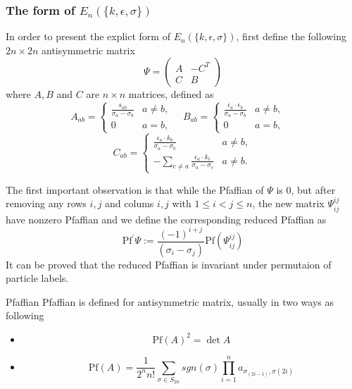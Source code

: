 \documentclass{beamer}
\begin{document}
\begin{frame}
    \frametitle{The form of $E_n(\{k,\epsilon,\sigma\})$}
    In order to present the explict form of $E_n(\{k,\epsilon,\sigma\})$, first define the following $2n\times2n$ antisymmetric matrix 
    \begin{equation*}
        \Psi=\begin{pmatrix}
            A & -C^T \\
            C & B 
        \end{pmatrix}
    \end{equation*}
    where $A,B$ and $C$ are $n\times n$ matrices, defined as 
    \begin{equation*}
        A_{ab}=\begin{cases}\frac{s_{ab}}{\sigma_a-\sigma_b}&a\neq b,\\0&a=b,\end{cases} \quad 
        B_{ab}=\begin{cases}\frac{\epsilon_a \cdot \epsilon_b}{\sigma_a-\sigma_b}&a\neq b,\\0&a=b, \end{cases} \quad
    \end{equation*}
    \begin{equation*}
        C_{ab}=\begin{cases}\frac{\epsilon_a\cdot k_b}{\sigma_a-\sigma_b}&a\neq b,\\-\sum_{c\neq a}\frac{\epsilon_a\cdot k_c}{\sigma_a-\sigma_c}&a\neq b.\end{cases}
    \end{equation*}
\end{frame}
\begin{frame}
    The first important observation is that while the Pfaffian of $\Psi$ is 0, but after removing any rows $i,j$ and colums $i,j$
    with $1\leq i< j\leq n$, the new matrix $\Psi_{ij}^{ij}$ have nonzero Pfaffian and we define the corresponding reduced Pfaffian as 
    \begin{equation*}
            \boxed{
            \mathrm{Pf}^{\prime}\Psi:=\frac{(-1)^{i+j}}{(\sigma_i-\sigma_j)}\mathrm{Pf}(\Psi_{ij}^{ij})}
    \end{equation*}
    It can be proved that the reduced Pfaffian is invariant under permutaion of \alert{particle labels}.
    
    \begin{alertblock}{Pfaffian}
        Pfaffian is defined for antisymmetric matrix, usually in two ways as following
        \begin{itemize}
            \item \begin{equation*}
                \mathrm{Pf}(A)^2=\det A
            \end{equation*}
            \item \begin{equation*}
                \mathrm{Pf}(A)=\frac{1}{2^n n!}\sum_{\sigma \in S_{2n}}sgn(\sigma)\prod_{i=1}^n a_{\sigma_{(2i-1)},\sigma(2i)}
            \end{equation*}
        \end{itemize}
    \end{alertblock}
\end{frame}
\end{document}
